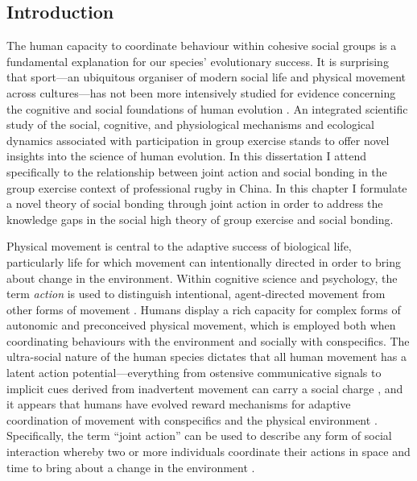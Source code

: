 \begin{CJK}{UTF8}{gbsn}
\section{Introduction}
The human capacity to coordinate behaviour within cohesive social groups is a fundamental explanation for our species' evolutionary success.  It is surprising that sport---an ubiquitous organiser of modern social life and physical movement across cultures---has not been more intensively studied for evidence concerning the cognitive and social foundations of human evolution \citep{Blanchard1995,Downey2005a}.  An integrated scientific study of the social, cognitive, and physiological mechanisms and ecological dynamics associated with participation in group exercise stands to offer novel insights into the science of human evolution.  In this dissertation I attend specifically to the relationship between joint action and social bonding in the group exercise context of professional rugby in China.  In this chapter I formulate a novel theory of social bonding through joint action in order to address the knowledge gaps in the social high theory of group exercise and social bonding.

Physical movement is central to the adaptive success of biological life, particularly life for which movement can intentionally directed in order to bring about change in the environment.  Within cognitive science and psychology, the term \textit{action} is used to distinguish intentional, agent-directed movement from other forms of movement \citep{Davidson1980}.  Humans display a rich capacity for complex forms of autonomic and preconceived physical movement, which is employed both when coordinating behaviours with the environment and socially with conspecifics.  The ultra-social nature of the human species dictates that all human movement has a latent action potential---everything from ostensive communicative signals to implicit cues derived from inadvertent movement can carry a social charge \citep{Danchin2004}, and it appears that humans have evolved reward mechanisms for adaptive coordination of movement with conspecifics and the physical environment \citep{Wheatley2012,Parkinson2015,Wheatley2016}. Specifically, the term ``joint action'' can be used to describe any form of social interaction whereby two or more individuals coordinate their actions in space and time to bring about a change in the environment \citep{Sebanz2006a}.


\end{CJK}
